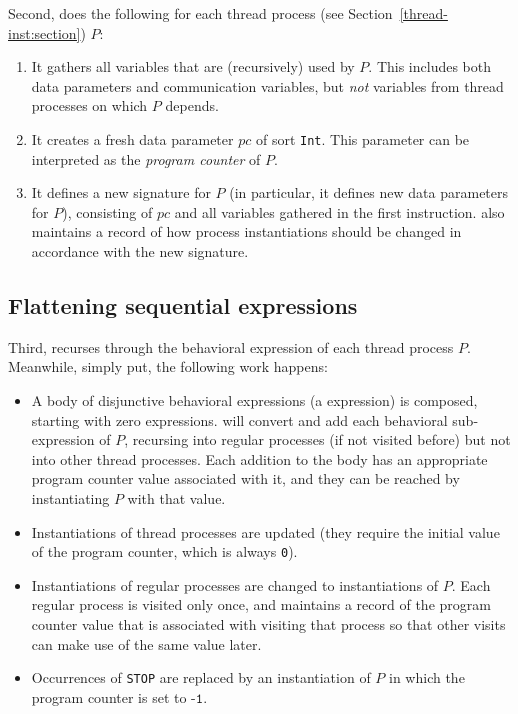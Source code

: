 Second, \lpeq{} does the following for each thread process (see Section~\ref{thread-inst:section}) $P$:
\begin{enumerate}[1.]
\item It gathers all variables that are (recursively) used by $P$.
This includes both data parameters and communication variables, but \emph{not} variables from thread processes on which $P$ depends.
\item It creates a fresh data parameter $\textit{pc}$ of sort \texttt{Int}.
This parameter can be interpreted as the \emph{program counter} of $P$.
\item It defines a new signature for $P$ (in particular, it defines new data parameters for $P$), consisting of $\textit{pc}$ and all variables gathered in the first instruction.
\lpeq{} also maintains a record of how process instantiations should be changed in accordance with the new signature.
\end{enumerate}

\subsection{Flattening sequential expressions} \label{flattenseqexprs:section}

Third, \lpeq{} recurses through the behavioral expression of each thread process $P$.
Meanwhile, simply put, the following work happens:
\begin{itemize}
\item A body of disjunctive behavioral expressions (a \choice{} expression) is composed, starting with zero expressions.
\lpeq{} will convert and add each behavioral sub-expression of $P$, recursing into regular processes (if not visited before) but not into other thread processes.
Each addition to the body has an appropriate program counter value associated with it, and they can be reached by instantiating $P$ with that value.
\item Instantiations of thread processes are updated (they require the initial value of the program counter, which is always \texttt{0}).
\item Instantiations of regular processes are changed to instantiations of $P$.
Each regular process is visited only once, and \lpeq{} maintains a record of the program counter value that is associated with visiting that process so that other visits can make use of the same value later.
\item Occurrences of \texttt{STOP} are replaced by an instantiation of $P$ in which the program counter is set to $\texttt{-1}$.
\end{itemize}


